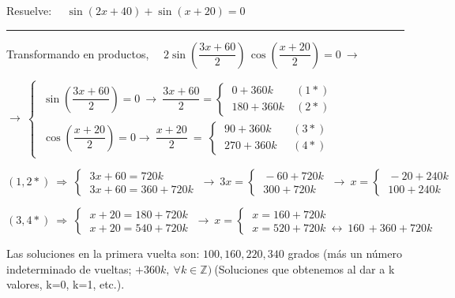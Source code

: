 \begin{miejercicio}

Resuelve: $\quad \sin(2x+40)+\sin(x+20)=0$

\rule{250pt}{0.1pt}

\vspace{4mm}
	
Transformando en productos, $\quad 2\sin \left( \dfrac{3x+60}{2} \right)\, \cos \left( \dfrac{x+20}{2} \right)=0 \ \to 	\ $

\vspace{2mm} $\to \ \begin{cases}
\ \sin \left( \dfrac{3x+60}{2} \right) = 0 \ \to \  \dfrac{3x+60}{2} = \begin{cases} \ 0+360 k &\  (1*) \\ \ 180+360 k &\ (2*) \end{cases}
\\
\ \cos \left( \dfrac{x+20}{2} \right)=0  \to \ \dfrac{x+20}{2} \ = \ \begin{cases} \ 90+360k &\ \ \, (3*) \\ \ 270+360k &\ \ \, (4*) \end{cases}	
 \end{cases}$
 
\vspace{2mm} $(1,2*) \ \Rightarrow \ \begin{cases} \ 3x+60=720k \\ \ 3x+60=360+720 k \end{cases} \ \to \ 3x= \begin{cases} \ -60+720 k \\ \ 300+720 k \end{cases} \ \to \ x=\begin{cases} \ -20+240k \\ \ 100+240 k \end{cases} $

\vspace{2mm} $(3,4*) \ \Rightarrow \ \begin{cases} \ x+20=180+720k \\ \ x+20=540+720k \end{cases} \ \to \  x=\begin{cases} \ x=160+720 k \\ \ x=520+720 k \ \leftrightarrow \ 160\, +360+720 k \end{cases} $

\vspace{2mm} Las soluciones en la primera vuelta son: $ 100,160,220,340$ grados (más un número indeterminado de vueltas; $+360 k,\ \forall k \in \mathbb Z)\ $\textcolor{gris}{(Soluciones que obtenemos al dar a k valores, k=0, k=1, etc.)}.
\end{miejercicio}


